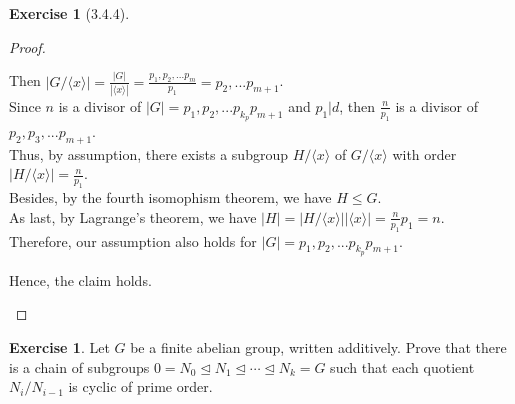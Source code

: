 \documentclass{amsart}
\theoremstyle{plain}
\theoremstyle{definition}
\newtheorem{exer}[lem]{Exercise}
\begin{document}
\begin{exer}[3.4.4]
\begin{proof}
\begin{enumerate}[(1)]
\begin{enumerate}[(a)]
				Then $|G/\langle x\rangle| = \frac{|G|}{|\langle x\rangle|} = \frac{p_1,p_2,...p_{m}}{p_1} = p_2,...p_{m+1}$.\\
				Since $n$ is a divisor of $|G|= p_1,p_2,...p_{k_p      }p_{m + 1}$ and $p_1|d$, then $\frac{n}{p_1}$ is a divisor of $p_2,p_3,...p_{m+1}$.\\
			   Thus, by assumption, there exists a subgroup $H/\langle x \rangle$ of $G/\langle x \rangle$ with order $|H/\langle x \rangle| = \frac{n}{p_1}$.\\
			   Besides, by the fourth isomophism theorem, we have $H \leq G$.\\ 
			   As last, by Lagrange's theorem, we have $|H| = |H/\langle x \rangle||\langle x \rangle|= \frac{n}{p_1} p_1 = n$.\\
			   Therefore, our assumption also holds for $|G|= p_1,p_2,...p_{k_p}p_{m + 1}$.
		\end{enumerate}
		Hence, the claim holds.\\
  \end{enumerate}
\end{proof}

\end{exer}

\begin{exer}
Let $G$ be a finite abelian group, written additively.
Prove that there is a chain of subgroups $0=N_0\unlhd N_1\unlhd\cdots\unlhd N_k=G$ such that each quotient $N_i/N_{i-1}$ is cyclic of prime order.
\end{exer}
\end{document}
